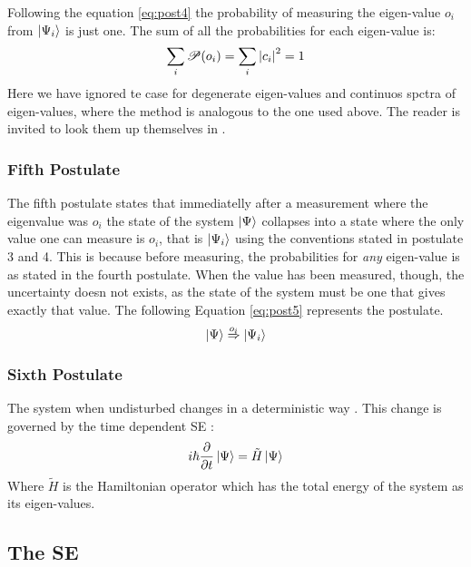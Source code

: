 \documentclass[../master_thesis.tex]{subfiles}
\begin{document}
Following the equation \ref{eq:post4} the probability of measuring the
eigen-value $o_i$ from $\ket{\Psi_i}$ is just one. The sum of all the probabilities
for each eigen-value is:
\begin{equation}
  \sum_i\mathscr{P}(o_i) = \sum_i \abs{c_i}^2 = 1
\end{equation}
Here we have ignored te case for degenerate eigen-values and continuos spctra of
eigen-values, where the method is analogous to the one used above. The reader is
invited to look them up themselves in \cite{Cohen:1973, Atkins:2011}.

\subsubsection{Fifth Postulate}
The fifth postulate states that immediatelly after a measurement where the eigenvalue was $o_i$
the state of the system $\ket{\Psi}$ collapses into a state where the only value one
can measure is $o_i$, that is $ \ket{\Psi_i} $ using the conventions stated in postulate 3 and 4.
This is because before measuring, the probabilities for \textit{any} eigen-value
is as stated in the fourth postulate. When the value has been measured, though,
the uncertainty doesn not exists, as the state of the system must be one that gives
exactly that value. The following Equation \ref{eq:post5} represents the postulate.
\begin{equation}\label{eq:post5}
  \ket{\Psi} \stackrel{o_i}{\Rightarrow} \ket{\Psi_i}
\end{equation}

\subsubsection{Sixth Postulate}
The system when undisturbed changes in a deterministic way \cite{Cohen:1973}.
This change is governed by the time dependent \ac{SE} \cite{Cohen:1973, Atkins:2011}:
\begin{equation}\label{eq:tdepSE}
  i\hbar\frac{\partial}{\partial t} \ket{\Psi} = \tilde{H}\ket{\Psi}
\end{equation}
Where $\tilde{H}$ is the Hamiltonian operator which has the total energy of the
system as its eigen-values.

\subsection{The \ac{SE}}
\end{document}
